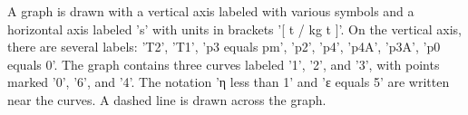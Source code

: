 A graph is drawn with a vertical axis labeled with various symbols and a horizontal axis labeled 's' with units in brackets '[ t / kg t ]'. On the vertical axis, there are several labels: 'T2', 'T1', 'p3 equals pm', 'p2', 'p4', 'p4A', 'p3A', 'p0 equals 0'. The graph contains three curves labeled '1', '2', and '3', with points marked '0', '6', and '4'. The notation 'η less than 1' and 'ε equals 5' are written near the curves. A dashed line is drawn across the graph.